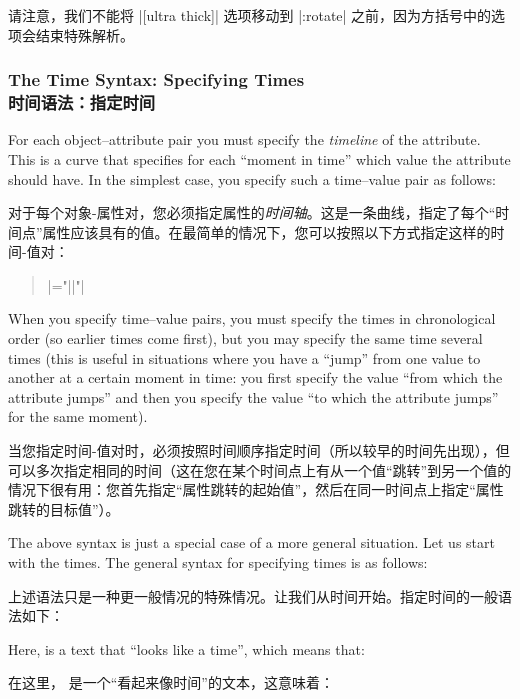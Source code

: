 请注意，我们不能将 |[ultra thick]| 选项移动到 |:rotate| 之前，因为方括号中的选项会结束特殊解析。


\subsubsection{The Time Syntax: Specifying Times\\时间语法：指定时间}

For each object--attribute pair you must specify the \emph{timeline} of the
attribute. This is a curve that specifies for each ``moment in time'' which
value the attribute should have. In the simplest case, you specify such a
time--value pair as follows:

对于每个对象-属性对，您必须指定属性的\emph{时间轴}。这是一条曲线，指定了每个“时间点”属性应该具有的值。在最简单的情况下，您可以按照以下方式指定这样的时间-值对：


\begin{quote}
    \normalfont
     |="||"|
\end{quote}

When you specify time--value pairs, you must specify the times in chronological
order (so earlier times come first), but you may specify the same time several
times (this is useful in situations where you have a ``jump'' from one value to
another at a certain moment in time: you first specify the value ``from which
the attribute jumps'' and then you specify the value ``to which the attribute
jumps'' for the same moment).

当您指定时间-值对时，必须按照时间顺序指定时间（所以较早的时间先出现），但可以多次指定相同的时间（这在您在某个时间点上有从一个值“跳转”到另一个值的情况下很有用：您首先指定“属性跳转的起始值”，然后在同一时间点上指定“属性跳转的目标值”）。

The above syntax is just a special case of a more general situation. Let us
start with the times. The general syntax for specifying times is as follows:

上述语法只是一种更一般情况的特殊情况。让我们从时间开始。指定时间的一般语法如下：

%
\begin{quote}
    \normalfont
     
\end{quote}

Here,  is a text that ``looks like a time'', which means that:

在这里， 是一个“看起来像时间”的文本，这意味着：


